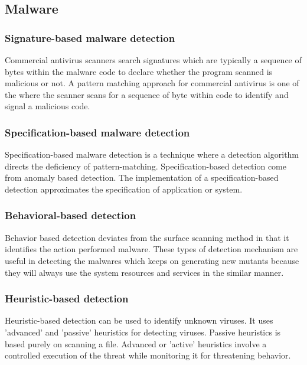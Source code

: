 \documentclass{ijitcs}
\begin{document}
\subsection{Malware}





\subsubsection{Signature-based malware detection}
Commercial antivirus scanners search signatures which are typically a sequence of bytes 
within the malware code to declare whether the program scanned is malicious or not. A pattern matching approach for commercial antivirus is one of the where the scanner scans for a sequence 
of byte within code to identify and signal a malicious code. \cite{divya2013survey}






\subsubsection{Specification-based malware detection}
Specification-based malware detection is a technique where a detection algorithm directs 
the deficiency of pattern-matching. Specification-based detection come from anomaly based 
detection. The implementation of a specification-based detection approximates the specification 
of application or system.\cite{divya2013survey}




\subsubsection{ Behavioral-based detection}
Behavior based detection deviates from the surface scanning method in that it identifies 
the action performed malware. These types of detection mechanism are useful in detecting the 
malwares which keeps on generating new mutants because they will always use the system 
resources and services in the similar manner. \cite{divya2013survey}






\subsubsection{Heuristic-based detection}
Heuristic-based detection can be used to identify unknown viruses. It uses 'advanced' and 
'passive' heuristics for detecting viruses. Passive heuristics is based purely on scanning a file. 
Advanced or 'active' heuristics involve a controlled execution of the threat while monitoring it 
for threatening behavior. \cite{divya2013survey}
\end{document}
